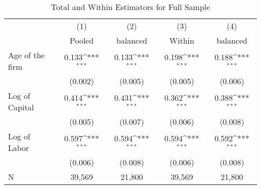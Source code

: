 \begin{table}[htbp]\centering
\def\sym#1{\ifmmode^{#1}\else\(^{#1}\)\fi}
\caption{Total and Within Estimators for Full Sample \label{tab:q4a}}
\begin{tabular}{l*{4}{c}}
\toprule
                    &\multicolumn{1}{c}{(1)}&\multicolumn{1}{c}{(2)}&\multicolumn{1}{c}{(3)}&\multicolumn{1}{c}{(4)}\\
                    &\multicolumn{1}{c}{Pooled}&\multicolumn{1}{c}{balanced}&\multicolumn{1}{c}{Within}&\multicolumn{1}{c}{balanced}\\
\midrule
Age of the firm     &       0.133\sym{***}&       0.133\sym{***}&       0.198\sym{***}&       0.188\sym{***}\\
                    &     (0.002)         &     (0.005)         &     (0.005)         &     (0.006)         \\
\addlinespace
Log of Capital      &       0.414\sym{***}&       0.431\sym{***}&       0.362\sym{***}&       0.388\sym{***}\\
                    &     (0.005)         &     (0.007)         &     (0.006)         &     (0.008)         \\
\addlinespace
Log of Labor        &       0.597\sym{***}&       0.594\sym{***}&       0.594\sym{***}&       0.592\sym{***}\\
                    &     (0.006)         &     (0.008)         &     (0.006)         &     (0.008)         \\
\midrule
N                   &      39,569         &      21,800         &      39,569         &      21,800         \\
\bottomrule
\end{tabular}
\end{table}
